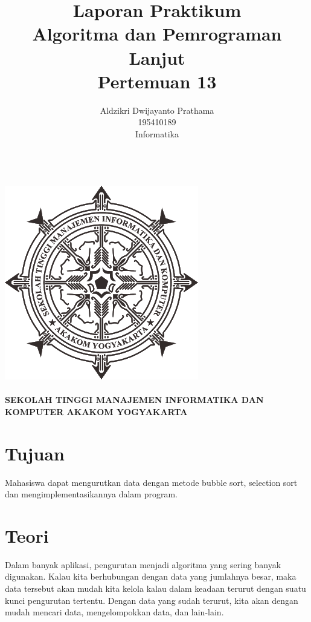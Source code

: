 \documentclass[a4paper,12pt]{article}
\begin{document}
\title{ {\Large Laporan Praktikum}\\ Algoritma dan Pemrograman Lanjut\\{\Large Pertemuan 13}}

\author{Aldzikri Dwijayanto Prathama
    \\195410189
    \\Informatika}
\makeatletter
\begin{titlepage}
    \begin{center}
        {\huge \bfseries \@title}\\[14ex]
        \includegraphics[scale=.8]{logo}\\[4ex]
        {\large \@author}\\[12ex]
        {\large \bfseries {SEKOLAH TINGGI MANAJEMEN INFORMATIKA DAN KOMPUTER
            AKAKOM YOGYAKARTA}}
    \end{center}


\end{titlepage}
\makeatother
\newpage
\tableofcontents
\newpage

\section{Tujuan}
Mahasiswa dapat mengurutkan data dengan metode bubble sort, selection sort
dan mengimplementasikannya dalam program.
\section{Teori}
Dalam banyak aplikasi, pengurutan menjadi algoritma yang sering banyak digunakan. Kalau kita berhubungan dengan data
yang jumlahnya besar, maka data tersebut akan mudah kita kelola kalau dalam keadaan terurut dengan suatu kunci
pengurutan tertentu. Dengan data yang sudah terurut, kita akan dengan mudah mencari data, mengelompokkan data, dan
lain-lain.
\end{document}
